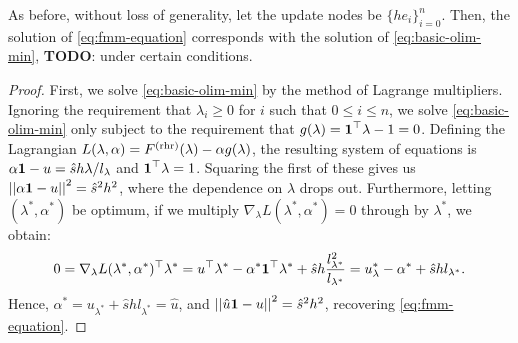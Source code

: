 \documentclass[eikonal.tex]{subfiles}
\begin{document}
\begin{theorem}
  As before, without loss of generality, let the update nodes be
  $\{h e_i\}_{i=0}^n$. Then, the solution of \cref{eq:fmm-equation}
  corresponds with the solution of \cref{eq:basic-olim-min},
  \textbf{TODO}: under certain conditions.
\end{theorem}

\begin{proof}
  First, we solve \cref{eq:basic-olim-min} by the method of Lagrange
  multipliers. Ignoring the requirement that $\lambda_i \geq 0$ for
  $i$ such that $0 \leq i \leq n$, we solve \cref{eq:basic-olim-min}
  only subject to the requirement that
  $g(\lambda) = \boldsymbol{1}^\top \lambda - 1 = 0$. Defining the Lagrangian
  $L(\lambda, \alpha) = F^{\operatorname{(rhr)}}(\lambda) - \alpha g(\lambda)$, the
  resulting system of equations is
  $\alpha \boldsymbol{1} - u = \hat{s} h \lambda / l_\lambda$ and
  $\boldsymbol{1}^\top \lambda = 1$. Squaring the first of these gives us
  $\left|\left|\alpha \boldsymbol{1} - u\right|\right|^2 = \hat{s}^2 h^2$, where the dependence on
  $\lambda$ drops out. Furthermore, letting $(\lambda^*, \alpha^*)$ be
  optimum, if we multiply $\nabla_\lambda L(\lambda^*, \alpha^*) = 0$ through by
  $\lambda^*$, we obtain:
  \begin{equation*}
    0 = \nabla_\lambda L(\lambda^*, \alpha^*)^\top \lambda^* = u^\top \lambda^* - \alpha^* \boldsymbol{1}^\top \lambda^* + \hat{s} h \frac{l_{\lambda^*}^2}{l_{\lambda^*}} = u_\lambda^* - \alpha^* + \hat{s} h l_{\lambda^*}.
  \end{equation*}
  Hence, $\alpha^* = u_{\lambda^*} + \hat{s} h l_{\lambda^*} = \hat{u}$, and
  $\left|\left|\hat{u} \boldsymbol{1} - u\right|\right|^2 = \hat{s}^2 h^2$, recovering
  \cref{eq:fmm-equation}.
\end{proof}
\end{document}

